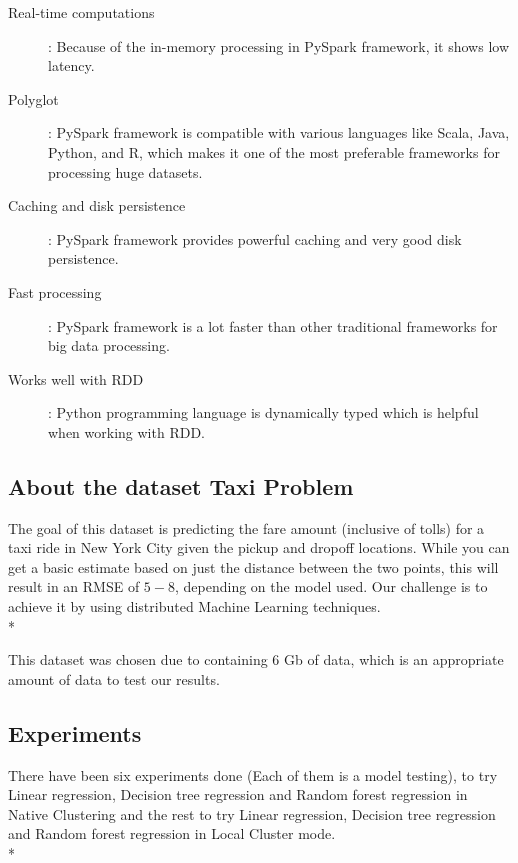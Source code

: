 \begin{description}
	\item [Real-time computations]: Because of the in-memory processing in PySpark framework, it shows low latency.
	\item [Polyglot]: PySpark framework is compatible with various languages like Scala, Java, Python, and R, which makes it one of the most preferable frameworks for processing huge datasets.
	\item [Caching and disk persistence]: PySpark framework provides powerful caching and very good disk persistence.
	\item [Fast processing]: PySpark framework is a lot faster than other traditional frameworks for big data processing.
	\item [Works well with RDD]: Python programming language is dynamically typed which is helpful when working with RDD.
\end{description}

\noindent
\subsection{About the dataset Taxi Problem} \cite{taxiDataset}

The goal of this dataset is predicting the fare amount (inclusive of tolls) for a taxi ride in New York City given the pickup and dropoff locations. While you can get a basic estimate based on just the distance between the two points, this will result in an RMSE of $5-$8, depending on the model used. Our challenge is to achieve it by using distributed Machine Learning techniques.\\*

This dataset was chosen due to containing 6 Gb of data, which is an appropriate amount of data to test our results.

\subsection{Experiments }

There have been six experiments done (Each of them is a model testing), to try Linear regression, Decision tree regression and Random forest regression in Native Clustering and the rest to try Linear regression, Decision tree regression and Random forest regression in Local Cluster mode.\\*


